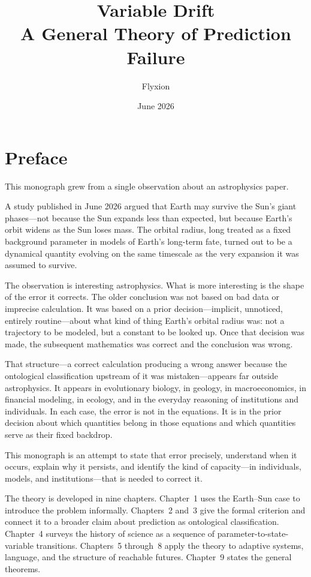 \documentclass[11pt]{book}
\title{\textbf{Variable Drift}\\[0.5em]
\large A General Theory of Prediction Failure}
\author{Flyxion}
\date{June 2026}
\theoremstyle{plain}
\theoremstyle{definition}
\theoremstyle{remark}
\begin{document}
\maketitle
\tableofcontents

\chapter*{Preface}

This monograph grew from a single observation about an astrophysics paper.

A study published in June 2026 argued that Earth may survive the Sun's giant phases---not because the Sun expands less than expected, but because Earth's orbit widens as the Sun loses mass. The orbital radius, long treated as a fixed background parameter in models of Earth's long-term fate, turned out to be a dynamical quantity evolving on the same timescale as the very expansion it was assumed to survive.

The observation is interesting astrophysics. What is more interesting is the shape of the error it corrects. The older conclusion was not based on bad data or imprecise calculation. It was based on a prior decision---implicit, unnoticed, entirely routine---about what kind of thing Earth's orbital radius was: not a trajectory to be modeled, but a constant to be looked up. Once that decision was made, the subsequent mathematics was correct and the conclusion was wrong.

That structure---a correct calculation producing a wrong answer because the ontological classification upstream of it was mistaken---appears far outside astrophysics. It appears in evolutionary biology, in geology, in macroeconomics, in financial modeling, in ecology, and in the everyday reasoning of institutions and individuals. In each case, the error is not in the equations. It is in the prior decision about which quantities belong in those equations and which quantities serve as their fixed backdrop.

This monograph is an attempt to state that error precisely, understand when it occurs, explain why it persists, and identify the kind of capacity---in individuals, models, and institutions---that is needed to correct it.

The theory is developed in nine chapters. Chapter~1 uses the Earth--Sun case to introduce the problem informally. Chapters~2 and~3 give the formal criterion and connect it to a broader claim about prediction as ontological classification. Chapter~4 surveys the history of science as a sequence of parameter-to-state-variable transitions. Chapters~5 through~8 apply the theory to adaptive systems, language, and the structure of reachable futures. Chapter~9 states the general theorems.
\end{document}
